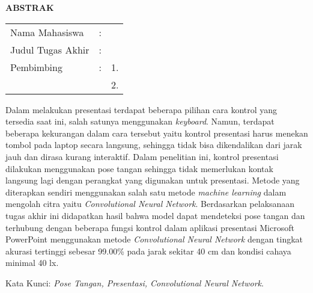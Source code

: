 \begin{center}
  \large\textbf{ABSTRAK}
\end{center}


\vspace{2ex}

\begingroup
\setlength{\tabcolsep}{0pt}

\noindent
\begin{tabularx}{\textwidth}{l >{\centering}m{2em} X}
  Nama Mahasiswa    & : & \name{}         \\

  Judul Tugas Akhir & : & \tatitle{}      \\

  Pembimbing        & : & 1. \advisor{}   \\
                    &   & 2. \coadvisor{} \\
\end{tabularx}
\endgroup

Dalam melakukan presentasi terdapat beberapa pilihan cara kontrol yang tersedia saat ini, salah satunya menggunakan \emph{keyboard}. Namun, terdapat beberapa kekurangan dalam cara tersebut yaitu kontrol presentasi harus menekan tombol pada laptop secara langsung, sehingga tidak bisa dikendalikan dari jarak jauh dan dirasa kurang interaktif. Dalam penelitian ini, kontrol presentasi dilakukan menggunakan pose tangan sehingga tidak memerlukan kontak langsung lagi dengan perangkat yang digunakan untuk presentasi. Metode yang diterapkan sendiri menggunakan salah satu metode \emph{machine learning} dalam mengolah citra yaitu \emph{Convolutional Neural Network}. Berdasarkan pelaksanaan tugas akhir ini didapatkan hasil bahwa model dapat mendeteksi pose tangan dan terhubung dengan beberapa fungsi kontrol dalam aplikasi presentasi Microsoft PowerPoint menggunakan metode \emph{Convolutional Neural Network} dengan tingkat akurasi tertinggi sebesar 99.00\% pada jarak sekitar 40 cm dan kondisi cahaya minimal 40 lx. 

Kata Kunci: \emph{Pose Tangan, Presentasi, Convolutional Neural Network}.
